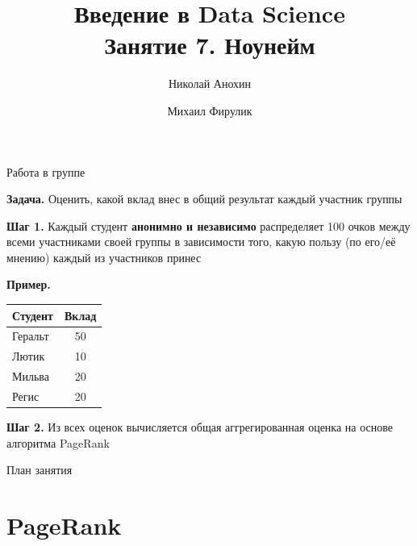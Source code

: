 \documentclass[10pt,a4paper]{beamer}
\author{Николай Анохин \and Михаил Фирулик}
\title{Введение в Data Science \\ Занятие 7. Ноунейм}
\begin{document}
\maketitle



\begin{frame}{Работа в группе}

{\bf Задача.} Оценить, какой вклад внес в общий результат каждый участник группы

\vspace{1em}
{\bf Шаг 1.} Каждый студент {\bf анонимно и независимо} распределяет 100 очков между всеми участниками своей группы в зависимости того, какую пользу (по его/её мнению) каждый из участников принес

\vspace{1em}
{\bf Пример.}

\begin{center}
\begin{tabular}{l c}
Студент & Вклад \\
\hline
Геральт & 50 \\
Лютик & 10 \\
Мильва & 20 \\
Регис & 20
\end{tabular}
\end{center}

{\bf Шаг 2.} Из всех оценок вычисляется общая аггрегированная оценка на основе алгоритма PageRank

\end{frame}


\begin{frame}{План занятия}

\tableofcontents

\end{frame}


\section{PageRank}
\end{document}
